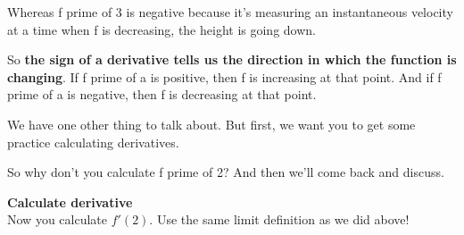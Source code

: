 \documentclass[pdftex, brazil, 12pt, twoside]{article}
\begin{document}
Whereas f prime of 3 is negative because it's
measuring an instantaneous velocity
at a time when f is decreasing, the height is going down.

So \textbf{the sign of a derivative tells us
the direction in which the function is changing}.
If f prime of a is positive, then f
is increasing at that point.
And if f prime of a is negative, then f
is decreasing at that point.

\begin{figure}[H]
  \begin{center}
    \label{fig:derivative-at-point-4}
  \end{center}
\end{figure}

We have one other thing to talk about.
But first, we want you to get some practice calculating
derivatives.

So why don't you calculate f prime of 2?
And then we'll come back and discuss.

\begin{exercise}
  \textbf{Calculate derivative}\\%
  Now you calculate $f'(2)$.
  Use the same limit definition as we did above! 
\end{exercise}

\begin{figure}[H]
  \begin{center}
    \label{fig:derivative-at-point-5}
  \end{center}
\end{figure}
\end{document}
